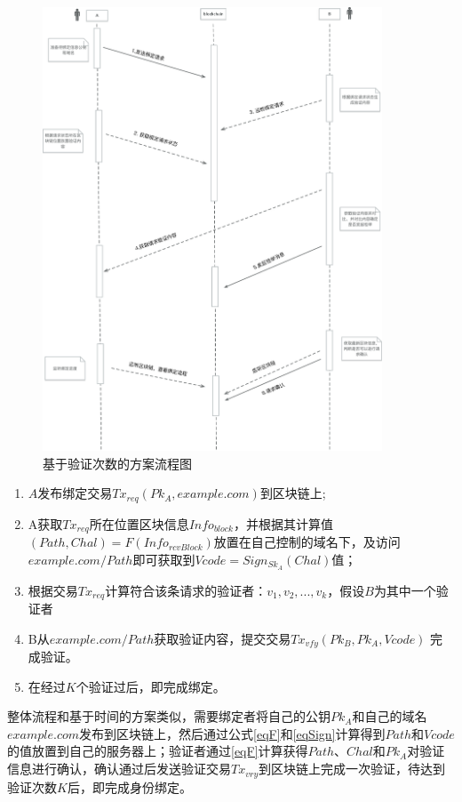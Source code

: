 \begin{figure}[htbp]
 	\centering
 	\includegraphics[width = 0.9\textwidth]{img/count_based_workflow}
 	\caption{基于验证次数的方案流程图}\label{fig:count_based_workflow}
\end{figure}

\begin{enumerate}
	\item $A$发布绑定交易$Tx_{req}(Pk_A, example.com)$到区块链上;
	\item  A获取$Tx_{req}$所在位置区块信息$Info_{block}$，并根据其计算值$(Path, Chal) = F(Info_{rcvBlock})$放置在自己控制的域名下，及访问$example.com/Path$即可获取到$Vcode = Sign_{Sk_A}(Chal)$值；
	\item 根据交易$Tx_{req}$计算符合该条请求的验证者：${v_1, v_2, ... , v_k}$，假设$B$为其中一个验证者
	\item B从$example.com/Path$获取验证内容，提交交易$Tx_{vfy}(Pk_B, Pk_A, Vcode)$ 完成验证。
	\item 在经过$K$个验证过后，即完成绑定。
\end{enumerate}

整体流程和基于时间的方案类似，需要绑定者将自己的公钥$Pk_A$和自己的域名$example.com$发布到区块链上，然后通过公式\eqref{eqF}和\eqref{eqSign}计算得到$Path$和$Vcode$的值放置到自己的服务器上；验证者通过\eqref{eqF}计算获得$Path$、$Chal$和$Pk_A$对验证信息进行确认，确认通过后发送验证交易$Tx_{vry}$到区块链上完成一次验证，待达到验证次数$K$后，即完成身份绑定。

